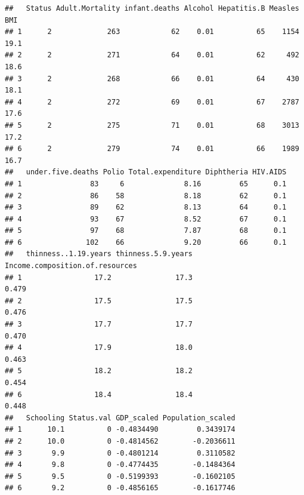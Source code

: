 \documentclass[
]{article}
\newenvironment{Shaded}{\begin{snugshade}}{\end{snugshade}}
\newcommand{\AttributeTok}[1]{\textcolor[rgb]{0.77,0.63,0.00}{#1}}
\newcommand{\CommentTok}[1]{\textcolor[rgb]{0.56,0.35,0.01}{\textit{#1}}}
\newcommand{\ConstantTok}[1]{\textcolor[rgb]{0.00,0.00,0.00}{#1}}
\newcommand{\DecValTok}[1]{\textcolor[rgb]{0.00,0.00,0.81}{#1}}
\newcommand{\FunctionTok}[1]{\textcolor[rgb]{0.00,0.00,0.00}{#1}}
\newcommand{\NormalTok}[1]{#1}
\newcommand{\OtherTok}[1]{\textcolor[rgb]{0.56,0.35,0.01}{#1}}
\newcommand{\SpecialCharTok}[1]{\textcolor[rgb]{0.00,0.00,0.00}{#1}}
\begin{document}
\begin{verbatim}
##   Status Adult.Mortality infant.deaths Alcohol Hepatitis.B Measles  BMI
## 1      2             263            62    0.01          65    1154 19.1
## 2      2             271            64    0.01          62     492 18.6
## 3      2             268            66    0.01          64     430 18.1
## 4      2             272            69    0.01          67    2787 17.6
## 5      2             275            71    0.01          68    3013 17.2
## 6      2             279            74    0.01          66    1989 16.7
##   under.five.deaths Polio Total.expenditure Diphtheria HIV.AIDS
## 1                83     6              8.16         65      0.1
## 2                86    58              8.18         62      0.1
## 3                89    62              8.13         64      0.1
## 4                93    67              8.52         67      0.1
## 5                97    68              7.87         68      0.1
## 6               102    66              9.20         66      0.1
##   thinness..1.19.years thinness.5.9.years Income.composition.of.resources
## 1                 17.2               17.3                           0.479
## 2                 17.5               17.5                           0.476
## 3                 17.7               17.7                           0.470
## 4                 17.9               18.0                           0.463
## 5                 18.2               18.2                           0.454
## 6                 18.4               18.4                           0.448
##   Schooling Status.val GDP_scaled Population_scaled
## 1      10.1          0 -0.4834490         0.3439174
## 2      10.0          0 -0.4814562        -0.2036611
## 3       9.9          0 -0.4801214         0.3110582
## 4       9.8          0 -0.4774435        -0.1484364
## 5       9.5          0 -0.5199393        -0.1602105
## 6       9.2          0 -0.4856165        -0.1617746
\end{verbatim}

\begin{Shaded}
\end{Shaded}
\end{document}
